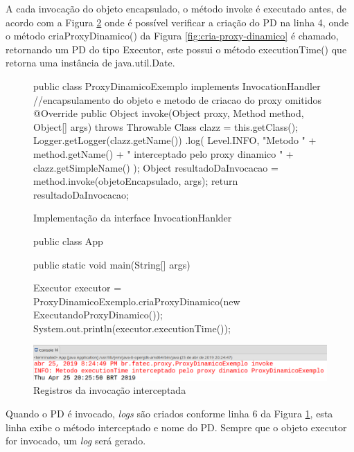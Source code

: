 \par A cada invocação do objeto encapsulado, o método invoke é executado antes, de acordo com a Figura \ref{fig:invoke-registrando-log} onde é possível verificar a criação do PD na linha 4, onde o método criaProxyDinamico() da Figura \ref{fig:cria-proxy-dinamico} é chamado, retornando um PD do tipo Executor, este possui o método executionTime() que retorna uma instância de java.util.Date.

\begin{figure}[H]
    \centering
    \caption{Implementação da interface InvocationHanlder}
\begin{java}
public class ProxyDinamicoExemplo implements InvocationHandler {
//encapsulamento do objeto e metodo de criacao do proxy omitidos
	@Override
	public Object invoke(Object proxy, Method method, Object[] args) throws Throwable {
		Class clazz = this.getClass();
		Logger.getLogger(clazz.getName())
		    .log(
                        Level.INFO, "Metodo " +
                        method.getName() + 
                        " interceptado pelo proxy dinamico " +
                        clazz.getSimpleName()
		    );
		Object resultadoDaInvocacao = method.invoke(objetoEncapsulado, args);
		return resultadoDaInvocacao;
	}
}
\end{java}
    \label{fig:invoke-implementacao}
\end{figure}

\begin{figure}[H]
    \centering
    \caption{Registros da invocação interceptada}
    \label{fig:invoke-registrando-log}
    \begin{java}
public class App {
	public static void main(String[] args) {
	
		Executor executor = ProxyDinamicoExemplo.criaProxyDinamico(new ExecutandoProxyDinamico());
		System.out.println(executor.executionTime());
	}
}
    \end{java}
    \includegraphics[scale=0.4]{src/imagens/cap2/invoke-registrando-log.png}
\end{figure}

Quando o PD é invocado, \textit{logs} são criados conforme linha 6 da Figura \ref{fig:invoke-implementacao}, esta linha exibe o método interceptado e nome do PD. Sempre que o objeto executor for invocado, um \textit{log} será gerado.

